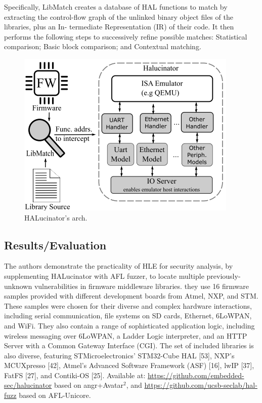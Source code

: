 Specifically,  LibMatch creates a database of HAL functions to match by extracting the control-flow graph of the unlinked binary object files of the libraries, plus an In- termediate Representation (IR) of their code. It then performs the following steps to successively refine possible matches: Statistical comparison; Basic block comparison; and Contextual matching.
\begin{figure}[h]
    \centering
    \includegraphics[width=.8\linewidth]{halucinator.png} %
    \caption{HALucinator's arch.}	
    \label{fig:halucinator}
\end{figure}
\subsection{Results/Evaluation}
The authors demonstrate the practicality of HLE for security analysis, by supplementing HALucinator with AFL fuzzer, to locate multiple previously-unknown vulnerabilities in firmware middleware libraries.  they use 16 firmware samples provided with different development boards from Atmel, NXP, and STM.  These samples were chosen for their diverse and complex hardware interactions, including serial communication, file systems on SD cards, Ethernet, 6LoWPAN, and WiFi.  They also contain a range of sophisticated application logic, including wireless messaging over 6LoWPAN, a Ladder Logic interpreter, and an HTTP Server with a Common Gateway Interface (CGI). The set of included libraries is also diverse, featuring STMicroelectronics’ STM32-Cube HAL [53], NXP’s MCUXpresso [42], Atmel’s Advanced Software Framework (ASF) [16], lwIP [37], FatFS [27], and Contiki-OS [25].
Available at: \url{https://github.com/embedded-sec/halucinator} based on angr+Avatar$^2$, and \url{https://github.com/ucsb-seclab/hal-fuzz} based on AFL-Unicore.
